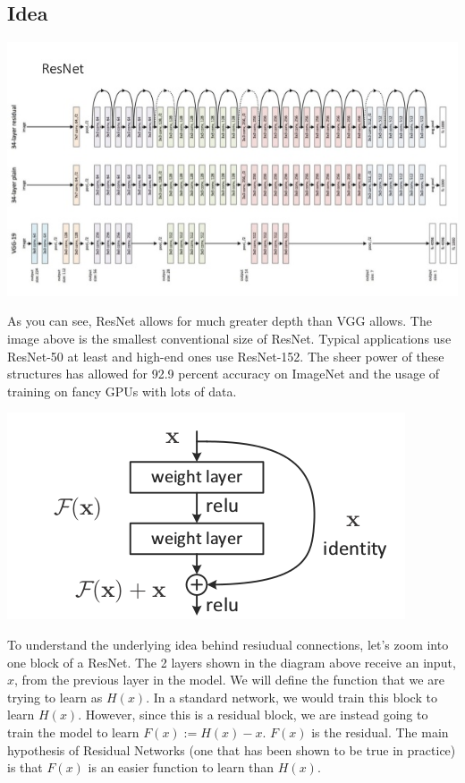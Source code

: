 \documentclass{article}
\begin{document}
\subsection{Idea}
\begin{center}
\includegraphics[scale=0.5]{resnet.jpg}
\end{center}
As you can see, ResNet allows for much greater depth than VGG allows. The image above is the smallest conventional size of ResNet. Typical applications use ResNet-50 at least and high-end ones use ResNet-152. The sheer power of these structures has allowed for 92.9 percent accuracy on ImageNet and the usage of training on fancy GPUs with lots of data.

\begin{center}
\includegraphics[scale=0.5]{resnet}
\end{center}
To understand the underlying idea behind resiudual connections, let's zoom into one block of a ResNet. The 2 layers shown in the diagram above receive an input, $x$, from the previous layer in the model. We will define the function that we are trying to learn as $H(x)$. In a standard network, we would train this block to learn $H(x)$. However, since this is a residual block, we are instead going to train the model to learn $F(x) := H(x) - x$. $F(x)$ is the residual. The main hypothesis of Residual Networks (one that has been shown to be true in practice) is that $F(x)$ is an easier function to learn than $H(x)$. \\
\end{document}
